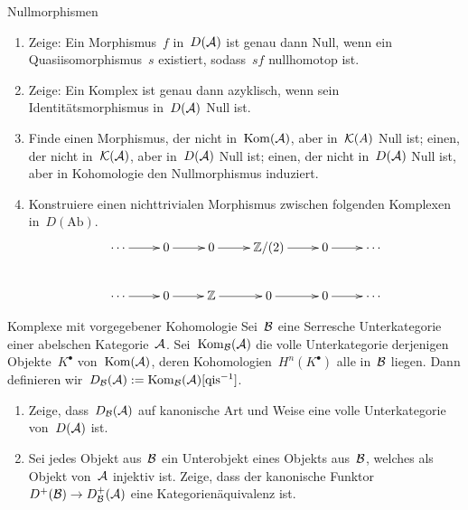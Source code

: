 \documentclass{uebblatt}
\begin{document}

\begin{aufgabe}{Nullmorphismen}
\begin{enumerate}
\item Zeige: Ein Morphismus~$f$ in~$D(\mathcal{A})$ ist genau dann Null, wenn ein
Quasiisomorphismus~$s$ existiert, sodass~$sf$ nullhomotop ist.
\item Zeige: Ein Komplex ist genau dann azyklisch, wenn sein
Identitätsmorphismus in~$D(\mathcal{A})$ Null ist.
\item Finde einen Morphismus, der nicht in~$\mathrm{Kom}(\mathcal{A})$, aber in~$\mathcal{K}(A)$ Null
ist; einen, der nicht in~$\mathcal{K}(\mathcal{A})$, aber in~$D(\mathcal{A})$ Null ist; einen, der nicht
in~$D(\mathcal{A})$ Null ist, aber in Kohomologie den Nullmorphismus induziert.
\item Konstruiere einen nichttrivialen Morphismus zwischen folgenden Komplexen
in~$D(\mathrm{Ab})$.
\[ \xymatrix{
  \cdots \ar[r] & 0 \ar[r] & 0 \ar[r] & \ZZ/(2) \ar[r] & 0 \ar[r] & \cdots \\
  \cdots \ar[r] & 0 \ar[r] & \ZZ \ar[r] & 0 \ar[r] & 0 \ar[r] & \cdots
} \]
\end{enumerate}
\end{aufgabe}

\begin{aufgabe}{Komplexe mit vorgegebener Kohomologie}
Sei~$\mathcal{B}$ eine Serresche Unterkategorie einer abelschen Kategorie~$\mathcal{A}$.
Sei~$\mathrm{Kom}_{\mathcal{B}}(\mathcal{A})$ die volle Unterkategorie derjenigen Objekte~$K^\bullet$
von~$\mathrm{Kom}(\mathcal{A})$, deren Kohomologien~$H^n(K^\bullet)$ alle in~$\mathcal{B}$ liegen.
Dann definieren wir~$D_{\mathcal{B}}(\mathcal{A}) := \mathrm{Kom}_{\mathcal{B}}(\mathcal{A})[\text{qis}^{-1}]$.
\begin{enumerate}
\item Zeige, dass~$D_{\mathcal{B}}(\mathcal{A})$ auf kanonische Art und Weise eine volle
Unterkategorie von~$D(\mathcal{A})$ ist.
\item Sei jedes Objekt aus~$\mathcal{B}$ ein Unterobjekt eines Objekts aus~$\mathcal{B}$, welches
als Objekt von~$\mathcal{A}$ injektiv ist. Zeige, dass der kanonische Funktor~$D^+(\mathcal{B})
\to D^+_{\mathcal{B}}(\mathcal{A})$ eine Kategorienäquivalenz ist.
\end{enumerate}
\end{aufgabe}
\end{document}
